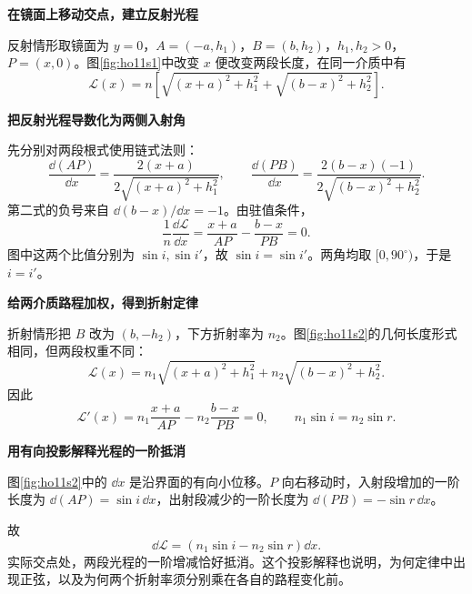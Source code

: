 \begin{solution}\textbf{在镜面上移动交点，建立反射光程}\par\nobreak
反射情形取镜面为 $y=0$，$A=(-a,h_1)$，$B=(b,h_2)$，$h_1,h_2>0$，$P=(x,0)$。图\ref{fig:ho11s1}中改变 $x$ 便改变两段长度，在同一介质中有
\[
\mathcal L(x)=n\left[\sqrt{(x+a)^2+h_1^2}
+\sqrt{(b-x)^2+h_2^2}\right].
\]


\par\medskip{}\noindent\textbf{把反射光程导数化为两侧入射角}\par\nobreak
先分别对两段根式使用链式法则：
\[
 \frac{\dd(AP)}{\dd x}=\frac{2(x+a)}{2\sqrt{(x+a)^2+h_1^2}},\qquad
 \frac{\dd(PB)}{\dd x}=\frac{2(b-x)(-1)}{2\sqrt{(b-x)^2+h_2^2}}.
\]
第二式的负号来自 $\dd(b-x)/\dd x=-1$。由驻值条件，
\[
\frac1n\frac{\dd\mathcal L}{\dd x}
=\frac{x+a}{AP}-\frac{b-x}{PB}=0.
\]
图中这两个比值分别为 $\sin i,\sin i'$，故 $\sin i=\sin i'$。两角均取 $[0,90^\circ)$，于是 $\boxed{i=i'}$。



\par\medskip{}\noindent\textbf{给两介质路程加权，得到折射定律}\par\nobreak
折射情形把 $B$ 改为 $(b,-h_2)$，下方折射率为 $n_2$。图\ref{fig:ho11s2}的几何长度形式相同，但两段权重不同：
\[
\mathcal L(x)=n_1\sqrt{(x+a)^2+h_1^2}
+n_2\sqrt{(b-x)^2+h_2^2}.
\]
因此
\[
\mathcal L'(x)=n_1\frac{x+a}{AP}-n_2\frac{b-x}{PB}=0,
\qquad \boxed{n_1\sin i=n_2\sin r}.
\]


\par\medskip{}\noindent\textbf{用有向投影解释光程的一阶抵消}\par\nobreak
图\ref{fig:ho11s2}中的 $\dd x$ 是沿界面的有向小位移。$P$ 向右移动时，入射段增加的一阶长度为 $\dd(AP)=\sin i\,\dd x$，出射段减少的一阶长度为 $\dd(PB)=-\sin r\,\dd x$。

故
\[
\dd\mathcal L=(n_1\sin i-n_2\sin r)\dd x.
\]
实际交点处，两段光程的一阶增减恰好抵消。这个投影解释也说明，为何定律中出现正弦，以及为何两个折射率须分别乘在各自的路程变化前。



\end{solution}
